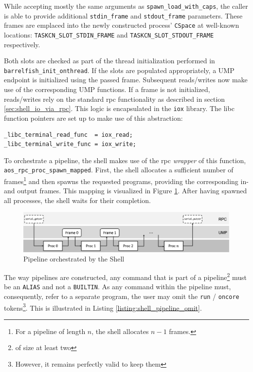 While accepting mostly the same arguments as \texttt{spawn\_load\_with\_caps}, the caller is able to provide additional \texttt{stdin\_frame} and \texttt{stdout\_frame} parameters. These frames are emplaced into the newly constructed process' \texttt{CSpace} at well-known locations: \texttt{TASKCN\_SLOT\_STDIN\_FRAME} and \texttt{TASKCN\_SLOT\_STDOUT\_FRAME} respectively.

Both slots are checked as part of the thread initialization performed in \texttt{barrelfish\_init\_onthread}. If the slots are populated appropriately, a UMP endpoint is initialized using the passed frame. Subsequent reads/writes now make use of the corresponding UMP functions. If a frame is not initialized, reads/writes rely on the standard rpc functionality as described in section \ref{sec:shell_io_via_rpc}. This logic is encapsulated in the \texttt{iox} library. The libc function pointers are set up to make use of this abstraction:

\begin{lstlisting}[caption={}]
_libc_terminal_read_func  = iox_read;
_libc_terminal_write_func = iox_write;\end{lstlisting}

To orchestrate a pipeline, the shell makes use of the rpc \emph{wrapper} of this function, \texttt{aos\_rpc\_proc\_spawn\_mapped}. First, the shell allocates a sufficient number of frames\footnote{For a pipeline of length $n$, the shell allocates $n - 1$ frames.} and then spawns the requested programs, providing the corresponding in- and output frames. This mapping is visualized in Figure \ref{fig:shell_pipes}. After having spawned all processes, the shell waits for their completion.

\begin{figure}[htp]
    \centering
    \includegraphics[width=12cm]{images/shell/shell_pipes.png}
    \caption{Pipeline orchestrated by the Shell}
    \label{fig:shell_pipes}
\end{figure}

The way pipelines are constructed, any command that is part of a pipeline\footnote{of size at least two} must be an \texttt{ALIAS} and not a \texttt{BUILTIN}. As any command within the pipeline must, consequently, refer to a separate program, the user may omit the \texttt{run} / \texttt{oncore} tokens\footnote{However, it remains perfectly valid to keep them}. This is illustrated in Listing \ref{listing:shell_pipeline_omit}.


